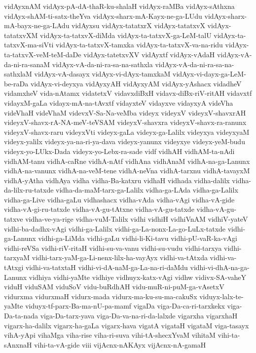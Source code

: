 {vidAyxnAM
vidAyx-pA-dA-thaR-ku-shalaH
vidAyx-raMBa
vidAyx-sAthxna
vidAyx-shAM-ti-satx-theYva
vidAyx-sharx-mA-Kayx-ne-ga-LUdu
vidAyx-sharx-mA-bayx-ne-ga-LAdu
vidAyxsu
vidAyx-tatatxrX
vidAyx-tatatxvX
vidAyx-tatatxvXM
vidAyx-ta-tatxvX-diMda
vidAyx-ta-tatxvX-ga-LeM-talU
vidAyx-ta-tatxvX-ma-siVti
vidAyx-ta-tatxvX-tamxka
vidAyx-ta-tatxvX-va-na-ridu
vidAyx-ta-tatxvX-veM-teM-daDe
vidAyx-tatetxvXV
vidAyxtf
vidAyx-vAdaH
vidAyx-vA-da-ni-ra-sanaM
vidAyx-vA-da-ni-ra-sa-na-sathxla
vidAyx-vA-da-ni-ra-sa-na-sathxlaM
vidAyx-vA-dasayx
vidAyx-vi-dAyx-tamxkaM
vidAyx-vi-dayx-ga-LeM-be-raDa
vidAyx-vi-deyxya
vidAyxyAH
vidAyxyAM
vidAyx-yAshacx
vidadheV
vidamxheV
vida-nAtamx
vidatetxV
vidavxdiBxH
vidavx-diBx-riV-ritAH
vidavxtf
vidayxM-gaLa
vidayx-mA-na-tAvxtf
vidayxteV
vidayxve
vidayxyA
videVha
videVhaH
videVhaM
videvxV-Sa-Na-veMba
videyx
videyxV
videyxV-shavxrAH
videyxV-shavx-rA-NA-meV-teVSAM
videyxV-shavxra
videyxV-shavx-ra-ranunx
videyxV-shavx-raru
videyxVti
videyx-gaLa
videyx-ga-Lalilx
videyxya
videyxyaM
videyx-yalilx
videyx-ya-na-ri-ya-dava
videyx-yanunx
videyxye
videyx-yeM-budu
videyx-yo-LUkx-Dada
videyx-yo-Lebx-ra-sade
vidf
vidhAH
vidhAM-ta-nAdi
vidhAM-tanu
vidhA-caRne
vidhA-nAtf
vidhAna
vidhAnaM
vidhA-na-ga-Lanunx
vidhA-na-vanunx
vidhA-na-veM-tene
vidhA-neVna
vidhA-tarxnu
vidhA-tavayxM
vidhA-yAtha
vidhAya
vidha
vidha-Ba-katxru
vidhaH
vidhada
vidha-dalilx
vidha-da-lilx-ru-tatxde
vidha-da-maM-tarx-ga-Lalilx
vidha-ga-LAda
vidha-ga-Lalilx
vidha-ga-Live
vidha-gaLu
vidhashacx
vidha-vAda
vidha-vAgi
vidha-vA-gide
vidha-vA-gi-ru-tatxde
vidha-vA-gu-tAtxne
vidha-vA-gu-tatxde
vidha-vA-gu-tatxve
vidha-ve-ya-rige
vidha-vuM-Talilx
vidhi
vidhiH
vidhiVnAM
vidhiV-yateV
vidhi-ba-dadhx-vAgi
vidhi-ga-Lalilx
vidhi-ga-La-nonx-La-go-LuLx-tatxde
vidhi-ga-Lanunx
vidhi-ga-LiMda
vidhi-gaLu
vidhi-li-Ki-tavu
vidhi-pU-vaR-ka-vAgi
vidhi-reVSa
vidhi-riV-ritaH
vidhi-su-va-vanu
vidhi-su-vudu
vidhi-tarxya
vidhi-tarxyaM
vidhi-tarx-yaM-ga-Li-nenx-lilx-ha-vayAyx
vidhi-va-tAtxda
vidhi-va-tAtxgi
vidhi-va-tatxtaH
vidhi-vi-dA-naM-ga-La-na-ri-daMdu
vidhi-vi-dhA-na-ga-Lanunx
vidhiya
vidhi-yaMte
vidhiye
vidhuyx-katx-vAgi
vidhw
vidivx-SA-vaheY
viduH
viduSAM
viduSoV
vidu-buRdhAH
vidu-muR-ni-puM-ga-vAsetxV
vidurxma
vidurxmaH
vidurx-mada
vidurx-ma-ku-su-ma-cakuSx
viduyx-lalx-te-yaMte
viduyx-tf-parx-Ba-ma-nU-pa-mamf
vigaDa
viga-Da-ca-ri-tarxkekx
viga-Da-ta-nada
viga-Da-tarx-yava
viga-Da-va-na-ri-da-lalxde
vigarxha
vigarxhaH
vigarx-ha-dalilx
vigarx-ha-gaLa
vigarx-hava
vigatA
vigataH
vigataM
viga-tasayx
vihA-yApi
vihaMga
viha-rise
viha-ri-suva
vihi-tA-shecxYvaM
vihitaM
vihi-ta-sAnxnaH
vihi-ta-vA-gide
viii
vijAcnx-nAKAyx
vijAcnx-nA-gamaH
}
